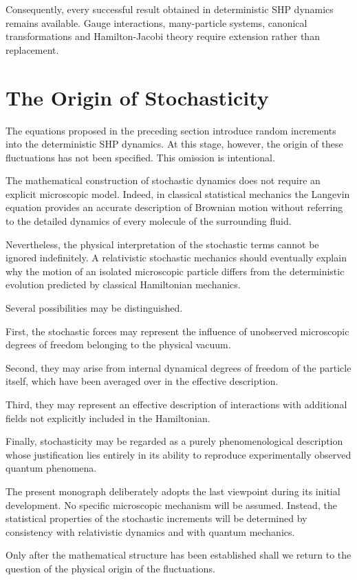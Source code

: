 Consequently, every successful result obtained in deterministic SHP dynamics
remains available. Gauge interactions, many-particle systems, canonical
transformations and Hamilton-Jacobi theory require extension rather than
replacement.
\section{The Origin of Stochasticity}

The equations proposed in the preceding section introduce random
increments into the deterministic SHP dynamics. At this stage,
however, the origin of these fluctuations has not been specified.
This omission is intentional.

The mathematical construction of stochastic dynamics does not require
an explicit microscopic model. Indeed, in classical statistical
mechanics the Langevin equation provides an accurate description of
Brownian motion without referring to the detailed dynamics of every
molecule of the surrounding fluid.

Nevertheless, the physical interpretation of the stochastic terms
cannot be ignored indefinitely. A relativistic stochastic mechanics
should eventually explain why the motion of an isolated microscopic
particle differs from the deterministic evolution predicted by
classical Hamiltonian mechanics.

Several possibilities may be distinguished.

First, the stochastic forces may represent the influence of
unobserved microscopic degrees of freedom belonging to the physical
vacuum.

Second, they may arise from internal dynamical degrees of freedom of
the particle itself, which have been averaged over in the effective
description.

Third, they may represent an effective description of interactions
with additional fields not explicitly included in the Hamiltonian.

Finally, stochasticity may be regarded as a purely phenomenological
description whose justification lies entirely in its ability to
reproduce experimentally observed quantum phenomena.

The present monograph deliberately adopts the last viewpoint during
its initial development. No specific microscopic mechanism will be
assumed. Instead, the statistical properties of the stochastic
increments will be determined by consistency with relativistic
dynamics and with quantum mechanics.

Only after the mathematical structure has been established shall we
return to the question of the physical origin of the fluctuations.

